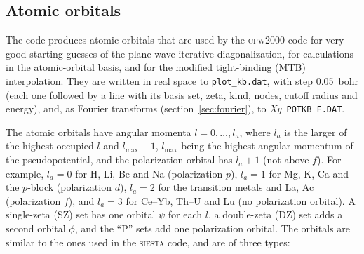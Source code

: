 \documentclass[11pt]{article}
\begin{document}
\subsection{Atomic orbitals}
\label{sec:orbital}

The code produces atomic orbitals that are used by the \textsc{cpw2000} code
for very good starting guesses of the plane-wave iterative
diagonalization, for calculations in the atomic-orbital basis, and for the modified
tight-binding (MTB) interpolation.
They are written in real space to \texttt{plot\_kb.dat}, with step 0.05~bohr (each one followed
by a line with its basis set, zeta, kind, nodes, cutoff radius and energy), and,
as Fourier transforms (section~\ref{sec:fourier}), to \textit{Xy}\texttt{\_POTKB\_F.DAT}.

The atomic orbitals have angular momenta $l = 0, \ldots, l_a$, where $l_a$ is the larger
of the highest occupied $l$ and $l_{\max}-1$, $l_{\max}$ being the highest angular momentum
of the pseudopotential, and the polarization orbital has $l_a+1$ (not above $f$).
For example, $l_a = 0$ for H, Li, Be and Na (polarization $p$), $l_a = 1$ for Mg, K, Ca and
the $p$-block (polarization $d$), $l_a = 2$ for the transition metals and La, Ac (polarization $f$),
and $l_a = 3$ for Ce--Yb, Th--U and Lu (no polarization orbital).
A single-zeta (SZ) set has one orbital $\psi$ for each $l$, a double-zeta (DZ) set adds
a second orbital $\phi$, and the ``P'' sets add one polarization orbital.
The orbitals are similar to the ones used in the \textsc{siesta} code,
and are of three types:
\end{document}
